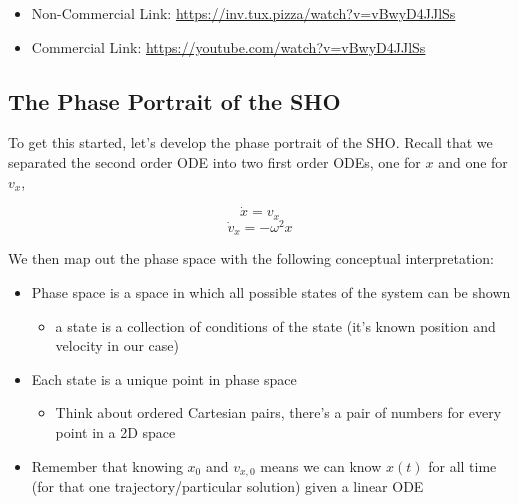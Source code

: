 \href{https://inv.tux.pizza/watch?v=vBwyD4JJlSs}{\pandocbounded{\texttt{[image: https://markdown-videos-api.jorgenkh.no/youtube/vBwyD4JJlSs?width=720\&height=405]}}}

\begin{itemize}
\tightlist
\item
  Non-Commercial Link: \url{https://inv.tux.pizza/watch?v=vBwyD4JJlSs}
\item
  Commercial Link: \url{https://youtube.com/watch?v=vBwyD4JJlSs}
\end{itemize}

\begin{Shaded}
\begin{Highlighting}[]
\end{Highlighting}
\end{Shaded}

\subsection{The Phase Portrait of the
SHO}\label{the-phase-portrait-of-the-sho}

To get this started, let's develop the phase portrait of the SHO. Recall
that we separated the second order ODE into two first order ODEs, one
for \(x\) and one for \(v_x\),

\[\dot{x} = v_x\] \[\dot{v}_x=-\omega^2x\]

We then map out the phase space with the following conceptual
interpretation:

\begin{itemize}
\tightlist
\item
  Phase space is a space in which all possible states of the system can
  be shown

  \begin{itemize}
  \tightlist
  \item
    a state is a collection of conditions of the state (it's known
    position and velocity in our case)
  \end{itemize}
\item
  Each state is a unique point in phase space

  \begin{itemize}
  \tightlist
  \item
    Think about ordered Cartesian pairs, there's a pair of numbers for
    every point in a 2D space
  \end{itemize}
\item
  Remember that knowing \(x_0\) and \(v_{x,0}\) means we can know
  \(x(t)\) for all time (for that one trajectory/particular solution)
  given a linear ODE
\end{itemize}

